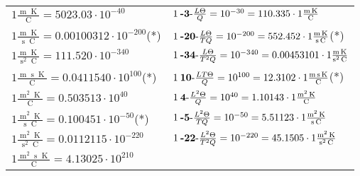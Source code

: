 \begin{center}
\begin{longtable}{l l}
{\color{black}$1 \bm{\mathrm{ }}\frac{\operatorname{m}\operatorname{K}}{\operatorname{C}} = 5023.03\cdot10^{-40} $}&
	{\color{black}$1\:\text{\textbf{-3}-} \frac{L\Theta}{Q}=10^{-30} = 110.335 \cdot 1 \bm{\mathrm{ }}\frac{\operatorname{m}\operatorname{K}}{\operatorname{C}}$}\\
{\color{black}$1 \bm{\mathrm{ }}\frac{\operatorname{m}\operatorname{K}}{\operatorname{s}\operatorname{C}} = 0.00100312\cdot10^{-200} $}\quad(*)&
	{\color{black}$1\:\text{\textbf{-20}-} \frac{L\Theta}{TQ}=10^{-200} = 552.452 \cdot 1 \bm{\mathrm{ }}\frac{\operatorname{m}\operatorname{K}}{\operatorname{s}\operatorname{C}}$}\quad(*)\\
{\color{black}$1 \bm{\mathrm{ }}\frac{\operatorname{m}\operatorname{K}}{\operatorname{s}^2\operatorname{C}} = 111.520\cdot10^{-340} $}&
	{\color{black}$1\:\text{\textbf{-34}-} \frac{L\Theta}{T^2Q}=10^{-340} = 0.00453101 \cdot 1 \bm{\mathrm{ }}\frac{\operatorname{m}\operatorname{K}}{\operatorname{s}^2\operatorname{C}}$}\\
{\color{black}$1 \bm{\mathrm{ }}\frac{\operatorname{m}\operatorname{s}\operatorname{K}}{\operatorname{C}} = 0.0411540\cdot10^{100} $}\quad(*)&
	{\color{black}$1\:\text{\textbf{10}-} \frac{LT\Theta}{Q}=10^{100} = 12.3102 \cdot 1 \bm{\mathrm{ }}\frac{\operatorname{m}\operatorname{s}\operatorname{K}}{\operatorname{C}}$}\quad(*)\\
{\color{black}$1 \bm{\mathrm{ }}\frac{\operatorname{m}^2\operatorname{K}}{\operatorname{C}} = 0.503513\cdot10^{40} $}&
	{\color{black}$1\:\text{\textbf{4}-} \frac{L^2\Theta}{Q}=10^{40} = 1.10143 \cdot 1 \bm{\mathrm{ }}\frac{\operatorname{m}^2\operatorname{K}}{\operatorname{C}}$}\\
{\color{black}$1 \bm{\mathrm{ }}\frac{\operatorname{m}^2\operatorname{K}}{\operatorname{s}\operatorname{C}} = 0.100451\cdot10^{-50} $}\quad(*)&
	{\color{black}$1\:\text{\textbf{-5}-} \frac{L^2\Theta}{TQ}=10^{-50} = 5.51123 \cdot 1 \bm{\mathrm{ }}\frac{\operatorname{m}^2\operatorname{K}}{\operatorname{s}\operatorname{C}}$}\\
{\color{black}$1 \bm{\mathrm{ }}\frac{\operatorname{m}^2\operatorname{K}}{\operatorname{s}^2\operatorname{C}} = 0.0112115\cdot10^{-220} $}&
	{\color{black}$1\:\text{\textbf{-22}-} \frac{L^2\Theta}{T^2Q}=10^{-220} = 45.1505 \cdot 1 \bm{\mathrm{ }}\frac{\operatorname{m}^2\operatorname{K}}{\operatorname{s}^2\operatorname{C}}$}\\
{\color{black}$1 \bm{\mathrm{ }}\frac{\operatorname{m}^2\operatorname{s}\operatorname{K}}{\operatorname{C}} = 4.13025\cdot10^{210} $}&

\end{longtable}
\end{center}
